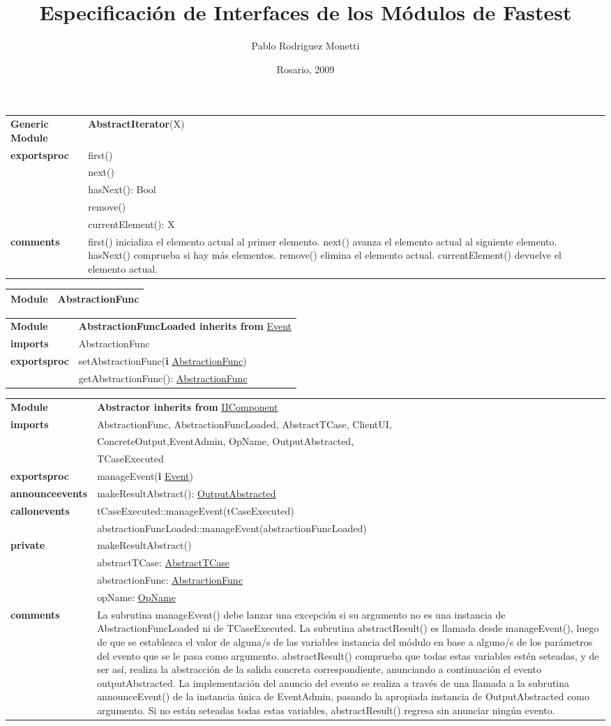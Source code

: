 \documentclass[12pt,a4paper,fleqn]{report}
\title{Especificación de Interfaces de los Módulos de Fastest}
\author{Pablo Rodriguez Monetti}
\date{Rosario, 2009}
\newenvironment{module}[1]{\hypertarget{mi:#1}{} \vspace{0.5cm}\noindent\begin{tabular}{|p{0.2\textwidth} p{0.75\textwidth}|} \hline{\bf Module} & {\bf #1} \\}{\hline\end{tabular}\vspace{0.5cm}}
\newenvironment{gmodule}[2]{\hypertarget{mi:#1}{} \vspace{0.5cm}\noindent\begin{tabular}{|p{0.2\textwidth} p{0.75\textwidth}|} \hline{\bf Generic Module} & {\bf #1}(#2) \\}{\hline\end{tabular}\vspace{0.5cm}}
\newenvironment{hmodule}[2]{\hypertarget{mi:#1}{} \vspace{0.5cm}\noindent\begin{tabular}{|p{0.2\textwidth} p{0.75\textwidth}|} \hline{\bf Module} & {\bf #1 inherits from} \hyperlink{mi:#2}{#2} \\}{\hline\end{tabular}\vspace{0.5cm}}
\newcommand{\eproc}{{\bf exportsproc}}
\newcommand{\annev}{{\bf announceevents}}
\newcommand{\callonev}{{\bf callonevents}}
\newcommand{\priv}{{\bf private}}
\newcommand{\proc}[1]{& #1 \\}
\newcommand{\e}[1]{{\bf i} \hyperlink{mi:#1}{#1}}
\newcommand{\imp}[1]{{\bf imports} & #1 \\}
\newcommand{\comm}[1]{{\bf comments} & #1 \\}
\newcommand{\mdr}[1]{\hyperlink{mi:#1}{#1}}
\newcommand{\extraline}[1]{& #1 \\}
\begin{document}
 \maketitle


\begin{gmodule}{AbstractIterator}{X}
\eproc
\proc{first()}
\proc{next()}
\proc{hasNext(): Bool}
\proc{remove()}
\proc{currentElement(): X}
\comm{first() inicializa el elemento actual al primer elemento. next() avanza el elemento actual al siguiente elemento. hasNext() comprueba si hay más elementos. remove() elimina el elemento actual. currentElement() devuelve el elemento actual.}
\end{gmodule}


\begin{module}{AbstractionFunc}
 
\end{module}


\begin{hmodule}{AbstractionFuncLoaded}{Event}
\imp{AbstractionFunc}
\eproc
\proc{setAbstractionFunc(\e {AbstractionFunc})}
\proc{getAbstractionFunc(): \mdr{AbstractionFunc}}
\end{hmodule}



\begin{hmodule}{Abstractor}{IIComponent}
\imp{AbstractionFunc, AbstractionFuncLoaded, AbstractTCase, ClientUI,}
\extraline{ConcreteOutput,EventAdmin, OpName, OutputAbstracted,}
\extraline{TCaseExecuted}
\eproc
\proc{manageEvent(\e {Event})}
\annev
\proc{makeResultAbstract(): \mdr{OutputAbstracted}}
\callonev
\proc{tCaseExecuted::manageEvent(tCaseExecuted)}
\proc{abstractionFuncLoaded::manageEvent(abstractionFuncLoaded)}
\priv
\proc{makeResultAbstract()}
\proc{abstractTCase: \mdr{AbstractTCase}}
\proc{abstractionFunc: \mdr{AbstractionFunc}}
\proc{opName: \mdr{OpName}}
\comm{La subrutina manageEvent() debe lanzar una excepción si su argumento no es una instancia de AbstractionFuncLoaded ni de TCaseExecuted. La subrutina abstractResult() es llamada desde manageEvent(), luego de que se establezca el valor de alguna/s de las variables instancia del módulo en base a alguno/s de los parámetros del evento que se le pasa como argumento. abstractResult() comprueba que todas estas variables estén seteadas, y de ser así, realiza la abstracción de la salida concreta correspondiente, anunciando a continuación el evento outputAbstracted. La implementación del anuncio del evento se realiza a través de una llamada a la subrutina announceEvent() de la instancia única de EventAdmin, pasando la apropiada instancia de OutputAbstracted como argumento. Si no están seteadas todas estas variables, abstractResult() regresa sin anunciar ningún evento.}
\end{hmodule}	
\end{document}
